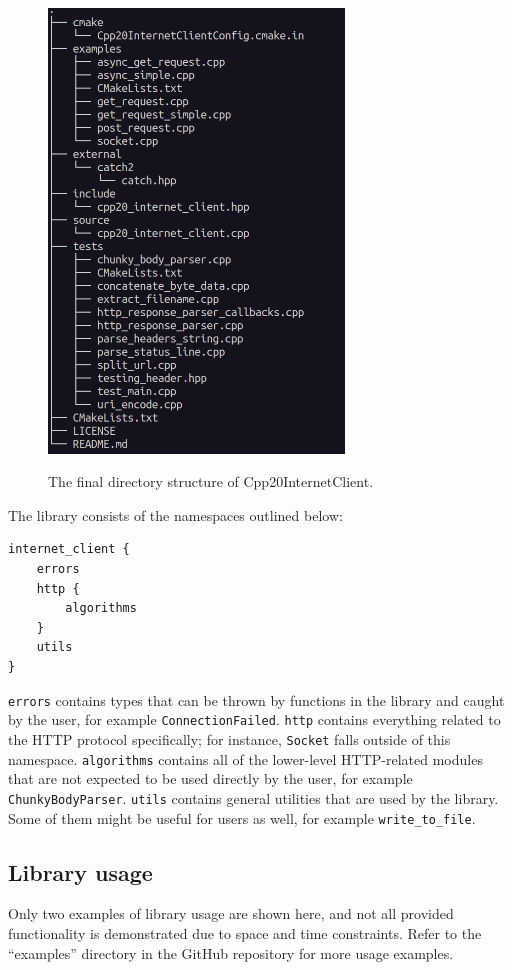 \documentclass[12pt, a4paper]{article}
\begin{document}
\begin{figure}[hp]
	\centering
	\caption{The final directory structure of Cpp20InternetClient.}
	\includegraphics[width=0.7\textwidth]{directory_structure}
	\label{fig:directory_structure}
\end{figure}

The library consists of the namespaces outlined below:

\begin{verbatim}
internet_client {
    errors
    http {
        algorithms
    }
    utils
}	
\end{verbatim}

\texttt{errors} contains types that can be thrown by functions in the library and caught by the user, for example \texttt{ConnectionFailed}. \texttt{http} contains everything related to the HTTP protocol specifically; for instance, \texttt{Socket} falls outside of this namespace. \texttt{algorithms} contains all of the lower-level HTTP-related modules that are not expected to be used directly by the user, for example \texttt{ChunkyBodyParser}. \texttt{utils} contains general utilities that are used by the library. Some of them might be useful for users as well, for example \texttt{write\_to\_file}.
\subsection{Library usage}
Only two examples of library usage are shown here, and not all provided functionality is demonstrated due to space and time constraints. Refer to the “examples” directory in the GitHub repository \parencite{Cpp20InternetClient} for more usage examples.
\end{document}
